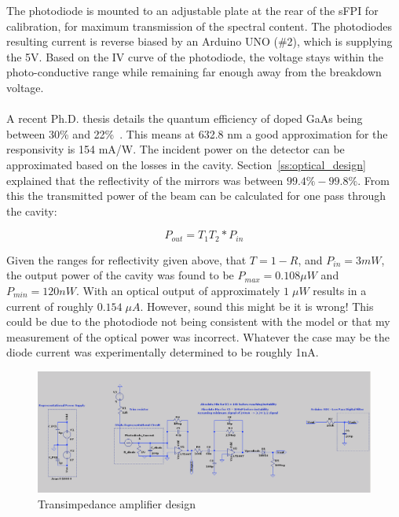 \documentclass[12pt,journal]{IEEEtran}
\begin{document}
The photodiode is mounted to an adjustable plate at the rear of the sFPI for calibration, for maximum transmission of the spectral content. The photodiodes resulting current is reverse biased by an Arduino UNO (\#2), which is supplying the 5V. Based on the IV curve of the photodiode, the voltage stays within the photo-conductive range while remaining far enough away from the breakdown voltage. 
\\\\
A recent Ph.D. thesis details the quantum efficiency of doped GaAs being between 30\% and 22\%~\cite{responsivity}. This means at 632.8 nm a good approximation for the responsivity is 154 mA/W. The incident power on the detector can be approximated based on the losses in the cavity. Section~\ref{ss:optical_design} explained that the reflectivity of the mirrors was between $99.4\% - 99.8\%$. From this the transmitted power of the beam can be calculated for one pass through the cavity:

\begin{equation}
P_{out} = T_1T_2*P_{in}
\end{equation}

Given the ranges for reflectivity given above, that $T = 1-R$, and $P_{in} = 3 mW$, the output power of the cavity was found to be $P_{max} = 0.108 \mu W$ and $P_{min} = 120 nW$. With an optical output of approximately $1\;\mu W$ results in a current of roughly $0.154\;\mu A$. However, sound this might be it is wrong! This could be due to the photodiode not being consistent with the model or that my measurement of the optical power was incorrect. Whatever the case may be the diode current was experimentally determined to be roughly 1nA. 

\begin{figure}
	\centering
	\includegraphics[width=\textwidth]{./transimpedance_amp_design.png}
	\caption{Transimpedance amplifier design}
	\label{fig{transimpedance-amp}}
\end{figure}
\end{document}
